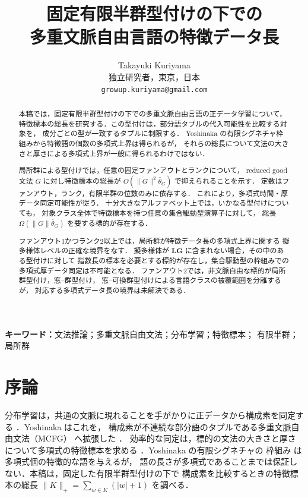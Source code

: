 \documentclass[11pt,a4paper]{ltjsarticle}
\title{固定有限半群型付けの下での\\
多重文脈自由言語の特徴データ長}
\author{Takayuki Kuriyama\\
独立研究者，東京，日本\\
\texttt{growup.kuriyama@gmail.com}}
\date{}
\numberwithin{equation}{section}
\theoremstyle{plain}
\theoremstyle{definition}
\theoremstyle{remark}
\theoremstyle{plain}
\begin{document}
\maketitle

\begin{abstract}
本稿では，固定有限半群型付けの下での多重文脈自由言語の正データ学習について，
特徴標本の総長を研究する．この型付けは，部分語タプルの代入可能性を比較する対象を，
成分ごとの型が一致するタプルに制限する．
Yoshinaka の有限シグネチャ枠組みから特徴語の個数の多項式上界は得られるが，
それらの総長について文法の大きさと厚さによる多項式上界が一般に得られるわけではない．

局所群による型付けでは，任意の固定ファンアウトとランクについて，
reduced good 文法 $G$ に対し特徴標本の総長が
$O(\|G\|^2\bar\theta_G)$ で抑えられることを示す．
定数はファンアウト，ランク，有限半群の位数のみに依存する．
これにより，多項式時間・厚データ同定可能性が従う．
十分大きなアルファベット上では，いかなる型付けについても，
対象クラス全体で特徴標本を持つ任意の集合駆動型演算子に対して，
総長 $\Omega(\|G\|\bar\theta_G)$ を要する標的が存在する．

ファンアウト1かつランク2以上では，局所群が特徴データ長の多項式上界に関する
擬多様体レベルの正確な境界をなす．
擬多様体が $\mathbf{LG}$ に含まれない場合，その中のある型付けに対して
指数長の標本を必要とする標的が存在し，集合駆動型の枠組みでの
多項式厚データ同定は不可能となる．
ファンアウト2では，非文脈自由な標的が局所群型付け，窓--群型付け，
窓--可換群型付けによる言語クラスの被覆範囲を分離するが，
対応する多項式データ長の境界は未解決である．
\end{abstract}

\noindent\textbf{キーワード：}文法推論；多重文脈自由文法；分布学習；特徴標本；
有限半群；局所群
\par\medskip

\section{序論}
\label{sec:introduction}

分布学習は，共通の文脈に現れることを手がかりに正データから構成素を同定する
\cite{Gold1967,Angluin1980,ClarkEyraud2007}．Yoshinaka はこれを，
構成素が不連続な部分語のタプルである多重文脈自由文法（MCFG）
\cite{SekiEtAl1991} へ拡張した \cite{Yoshinaka2009,Yoshinaka2011}．
効率的な同定は，標的の文法の大きさと厚さについて多項式の特徴標本を求める
\cite{Yoshinaka2008,EyraudHeinzYoshinaka2016}．Yoshinaka の有限シグネチャの
枠組み \cite{Yoshinaka2015General} は多項式個の特徴的な語を与えるが，
語の長さが多項式であることまでは保証しない．本稿は，固定した有限半群型付けの下で
構成素を比較するときの特徴標本の総長
$\|K\|_+=\sum_{w\in K}(|w|+1)$ を調べる．
\end{document}
